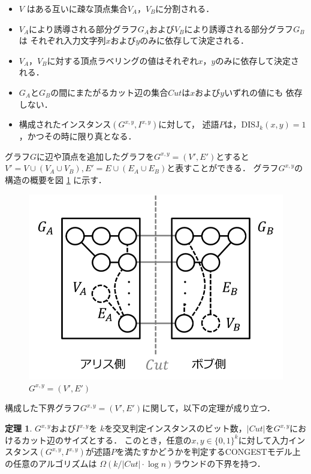 \documentclass[12pt]{thesis}
\newcommand{\CONGEST}{\textsf{CONGEST}}
\theoremstyle{definition}
\newtheorem{theorem}{定理}[chapter]
\begin{document}
\begin{itemize}
\item $V$ はある互いに疎な頂点集合$V_A$，$V_B$に分割される．
\item $V_A$により誘導される部分グラフ$G_A$および$V_B$により誘導される部分グラフ$G_B$は
それぞれ入力文字列$x$および$y$のみに依存して決定される．
\item $V_A$，$V_B$に対する頂点ラベリングの値はそれぞれ$x$，$y$のみに依存して決定される．
\item $G_A$と$G_B$の間にまたがるカット辺の集合$\mathit{Cut}$は$x$および$y$いずれの値にも
依存しない．
\item 構成されたインスタンス$(G^{x,y}, I^{x,y})$に対して，
述語$P$は，$\mathrm{DISJ}_{k} (x, y)=1$，かつその時に限り真となる．
\end{itemize}
グラフ$G$に辺や頂点を追加したグラフを$G^{x, y} = (V', E')$とすると
$V' = V \cup (V_{A} \cup V_{B}), E' = E \cup (E_{A} \cup E_{B})$と表すことができる．
グラフ$G^{x, y}$の構造の概要を図 \ref{Gxy} に示す．
\begin{figure}[ht]
\begin{center}
\includegraphics[width=120mm]{Gxy.png}
\end{center}
\caption{$G^{x, y} = (V', E')$}
\label{Gxy}
\end{figure}
構成した下界グラフ$G^{x, y} = (V', E')$に関して，以下の定理が成り立つ．
\begin{theorem}
$G^{x,y}$および$I^{x,y}$を
$k$を交叉判定インスタンスのビット数，$|\mathit{Cut}|$を$G^{x, y}$におけるカット辺のサイズとする．
このとき，任意の$x, y \in \{0, 1\}^k$に対して入力インスタンス$(G^{x, y}, I^{x,y})$が述語$P$を満たすかどうかを判定する{\CONGEST}モデル上の任意のアルゴリズムは
$\Omega (k / |\mathit{Cut}| \cdot \log n)$ラウンドの下界を持つ．
\label{lower}
\end{theorem}
\end{document}
